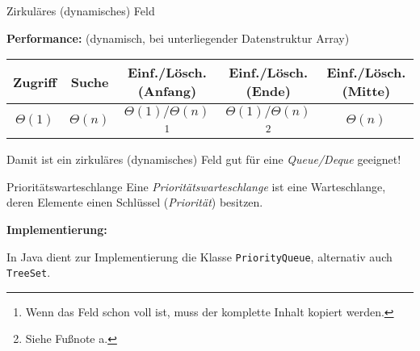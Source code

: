 \documentclass[german]{../spicker}
\begin{document}
\begin{defi}{Zirkuläres (dynamisches) Feld}
\begin{center}
    \end{center}

    \textbf{Performance:} (dynamisch, bei unterliegender Datenstruktur Array)

    \begin{center}
        \begin{tabular}{c|c|c|c|c}
            Zugriff     & Suche       & Einf./Lösch. (Anfang)                                                                                   & Einf./Lösch. (Ende)                              & Einf./Lösch. (Mitte) \\
            \hline
            $\Theta(1)$ & $\Theta(n)$ & $\Theta(1)/\Theta(n)$\footnote{Wenn das Feld schon voll ist, muss der komplette Inhalt kopiert werden.} & $\Theta(1)/\Theta(n)$\footnote{Siehe Fußnote a.} & $\Theta(n)$          \\
        \end{tabular}
    \end{center}

    Damit ist ein zirkuläres (dynamisches) Feld gut für eine \emph{Queue/Deque} geeignet!
\end{defi}

\begin{bonus}{Prioritätswarteschlange}
    Eine \emph{Prioritätswarteschlange} ist eine Warteschlange, deren Elemente einen Schlüssel (\emph{Priorität}) besitzen.

    \textbf{Implementierung:}

    In Java dient zur Implementierung die Klasse \texttt{PriorityQueue}, alternativ auch \texttt{TreeSet}.
\end{bonus}
\end{document}
